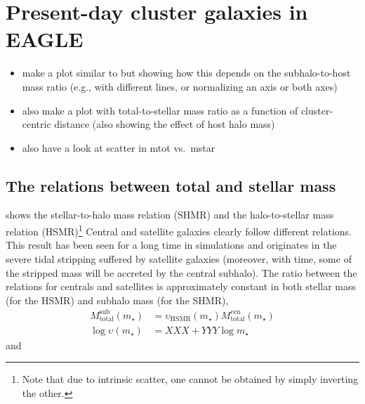 \documentclass[usenatbib,fleqn]{mnras}
\newcommand{\eagle}{EAGLE}
\newcommand{\mstar}{m_\star}
\newcommand{\Mtotal}{M_\mathrm{total}}
\newcommand{\zcent}{z_\mathrm{cent}}
\newcommand{\zinfall}{z_\mathrm{infall}}
\begin{document}


\section{Present-day cluster galaxies in \eagle}

\begin{itemize}
  \item make a plot similar to  but showing how this depends on the subhalo-to-host mass ratio (e.g., with different lines, or normalizing an axis or both axes)
  \item also make a plot with total-to-stellar mass ratio as a function of cluster-centric distance (also showing the effect of host halo mass)
  \item also have a look at scatter in mtot vs.\ mstar
\end{itemize}


\subsection{The relations between total and stellar mass}

 shows the stellar-to-halo mass relation (SHMR) and the halo-to-stellar mass relation (HSMR)\footnote{Note that due to intrinsic scatter, one cannot be obtained by simply inverting the other.} Central and satellite galaxies clearly follow different relations. This result has been seen for a long time in simulations and originates in the severe tidal stripping suffered by satellite galaxies (moreover, with time, some of the stripped mass will be accreted by the central subhalo). The ratio between the relations for centrals and satellites is approximately constant in both stellar mass (for the HSMR) and subhalo mass (for the SHMR),
\begin{align}\label{eq:relation_ratios}
  \Mtotal^\mathrm{sub}(\mstar) 
      &= \upsilon_\mathrm{HSMR}(\mstar) \Mtotal^\mathrm{cen}(\mstar) \\
  \log \upsilon(\mstar) &= XXX + YYY \log \mstar
\end{align}
and
\end{document}
